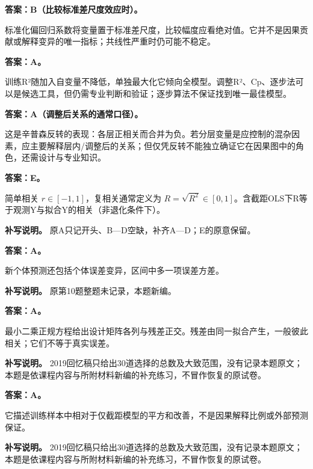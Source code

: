 
\textbf{答案：B（比较标准差尺度效应时）。}

标准化偏回归系数将变量置于标准差尺度，比较幅度应看绝对值。它并不是因果贡献或解释变异的唯一指标；共线性严重时仍可能不稳定。



\textbf{答案：A。}

训练R²随加入自变量不降低，单独最大化它倾向全模型。调整R²、Cp、逐步法可以是候选工具，但仍需专业判断和验证；逐步算法不保证找到唯一最佳模型。



\textbf{答案：A（调整后关系的通常口径）。}

这是辛普森反转的表现：各层正相关而合并为负。若分层变量是应控制的混杂因素，应主要解释层内/调整后的关系；但仅凭反转不能独立确证它在因果图中的角色，还需设计与专业知识。



\textbf{答案：E。}

简单相关 \(r\in[-1, 1]\)，复相关通常定义为 \(R=\sqrt{R^2}\in[0, 1]\)。含截距OLS下R等于观测Y与拟合Y的相关（非退化条件下）。


\textbf{补写说明。} 原A只记开头、B---D空缺，补齐A---D；E的原意保留。



\textbf{答案：A。}

新个体预测还包括个体误差变异，区间中多一项误差方差。


\textbf{补写说明。} 原第10题整题未记录，本题新编。



\textbf{答案：A。}

最小二乘正规方程给出设计矩阵各列与残差正交。残差由同一拟合产生，一般彼此相关；它们不等于真实误差。


\textbf{补写说明。} 2019回忆稿只给出30道选择的总数及大致范围，没有记录本题原文；本题是依课程内容与所附材料新编的补充练习，不冒作恢复的原试卷。



\textbf{答案：A。}

它描述训练样本中相对于仅截距模型的平方和改善，不是因果解释比例或外部预测保证。


\textbf{补写说明。} 2019回忆稿只给出30道选择的总数及大致范围，没有记录本题原文；本题是依课程内容与所附材料新编的补充练习，不冒作恢复的原试卷。


